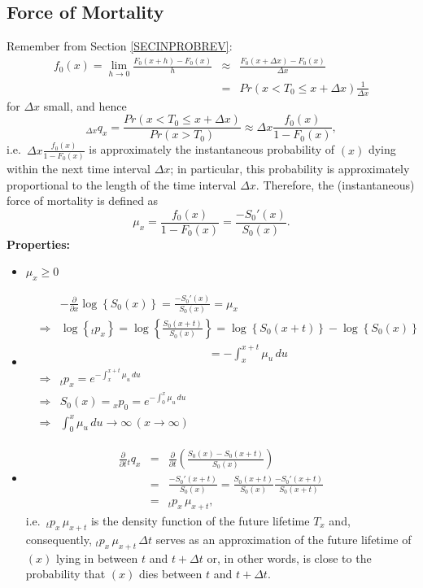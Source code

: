 \documentclass[11pt,fleqn,oneside]{book}
\begin{document}
\subsection*{Force of Mortality}
Remember from Section \ref{SECINPROBREV}:
\begin{eqnarray*}
f_0(x) = \lim_{h \rightarrow 0} \frac{F_0(x+h) - F_0(x)}{h} &\approx& \frac{F_0(x+ \Delta x) - F_0(x)}{\Delta x} \\
&=& Pr(x < T_0 \leq x + \Delta x) \frac{1}{\Delta x}
\end{eqnarray*}
for $\Delta x$ small, and hence
$$
{_{\Delta x} q_x} = \frac{Pr(x < T_0 \leq x + \Delta x)}{Pr(x>T_0)} \approx \Delta x \frac{f_0(x)}{1-F_0(x)},
$$
i.e.\  $\Delta x \frac{f_0(x)}{1-F_0(x)}$ is approximately the instantaneous probability of $(x)$ dying within the next time interval $\Delta x$; in particular, this probability is approximately proportional to the length of the time interval $\Delta x$. Therefore, the (instantaneous) force of mortality is defined as
$$
\mu_x = \frac{f_0(x)}{1-F_0(x)} = \frac{-S_0'(x)}{S_0(x)}.
$$
\textbf{Properties:}
\begin{itemize}
\item $\mu_x \geq 0$
\item 
\begin{eqnarray*}
&& -\frac{\partial}{\partial x} \log\left\{S_0(x)\right\} = \frac{-S_0'(x)}{S_0(x)} = \mu_x \\
&\Rightarrow&\log\left\{{_tp_x}\right\} =  \log\left\{\frac{S_0(x+t)}{S_0(x)}\right\}
=   \log\left\{S_0(x+t)\right\} -   \log\left\{S_0(x)\right\} \\
&&\quad \quad \quad \quad \quad \quad \quad \quad \quad \quad \quad \quad \quad = -\int_x^{x+t} \mu_u\,du \\
&\Rightarrow& {_tp_x} = e^{-\int_x^{x+t} \mu_u\,du}\\ 
&\Rightarrow& S_0(x) = {_xp_0} = e^{-\int_0^{x} \mu_u\,du}\\ 
&\Rightarrow& \int_0^{x} \mu_u\,du \rightarrow  \infty \,(x \rightarrow \infty)
\end{eqnarray*}
\item
\begin{eqnarray*}
\frac{\partial}{\partial t} {_tq_x} &=& \frac{\partial}{\partial t} \left(\frac{S_0(x) - S_0(x+t)}{S_0(x)}\right)\\
&=& \frac{-S_0'(x+t)}{S_0(x)} = \frac{S_0(x+t)}{S_0(x)} \frac{-S_0'(x+t)}{S_0(x+t)} \\
&=& {_tp_x}\,\mu_{x+t},
\end{eqnarray*}
i.e.\ ${_tp_x}\,\mu_{x+t}$ is the density function of the future lifetime $T_x$ and, consequently,
${_tp_x}\,\mu_{x+t}\,\Delta t$ serves as an approximation of the future lifetime of $(x)$ lying in between $t$ and $t + \Delta t$ or, in other words, is close to the probability that $(x)$ dies between $t$ and $t + \Delta t$.
\end{itemize}
\end{document}
